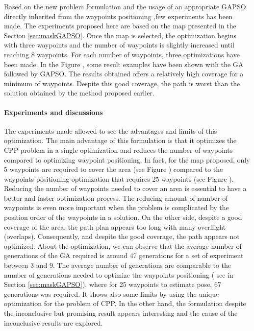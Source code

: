 		
	Based on the new problem formulation and the usage of an appropriate GAPSO directly inherited from the waypoints positioning ,few experiments has been made. The experiments proposed here are based on the map presented in the Section \ref{sec:maskGAPSO}.
  Once the map is selected, the optimization begins with three waypoints and the number of waypoints is slightly increased until reaching 8 waypoints. For each number of waypoints,  three optimizations have been made. In the Figure , some result examples have been shown with the GA followed  by GAPSO. The results obtained offers a relatively high coverage for a minimum of waypoints. Despite this good coverage, the path is worst than the solution obtained by the method proposed earlier.  

	\paragraph*{Experiments and discussions}	
The experiments made allowed to see the advantages and limits of this optimization. 
The main advantage of this formulation is that it optimizes the CPP problem in a single optimization and reduces the number of waypoints compared to optimizing waypoint positioning. In fact, for the map proposed, only  5 waypoints are required to cover  the area (see Figure ) compared to the waypoints positioning optimization that requires 25 waypoints (see Figure ). Reducing the number of waypoints needed to cover an area is essential to have a better and faster optimization process. The reducing amount of number of waypoints is even more important when the problem is complicated by the position order of the waypoints in a solution. 
	On the other side, despite a good coverage of the area, the path plan appears too long with many overflight (overlaps). Consequently, and despite the good  coverage, the path appears not optimized. 
	About the optimization, we can observe that the average number of generations of the GA required is around 47 generations for a set of experiment between 3 and 9. The average number of generations  are  comparable to the number of generations needed to optimize the waypoints positioning ( see in Section \ref{sec:maskGAPSO}), where for 25 waypoints to estimate pose, 67 generations was required. 
	It shows also some limits by using the unique optimization for the problem of CPP. In the other hand, the formulation despite the inconclusive but promising result appears interesting and the cause of the inconclusive results are explored.
	
